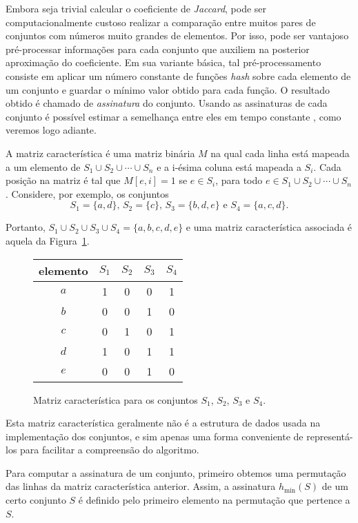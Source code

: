 Embora seja trivial calcular o coeficiente de \emph{Jaccard}, pode ser computacionalmente custoso realizar a comparação entre muitos pares de conjuntos com números muito grandes de elementos. Por isso, pode ser vantajoso pré-processar informações para cada conjunto que auxiliem na posterior aproximação do coeficiente. Em sua variante básica, tal pré-processamento consiste em aplicar um número constante de funções \emph{hash} sobre cada elemento de um conjunto e guardar o mínimo valor obtido para cada função. O resultado obtido é chamado de \emph{assinatura} do conjunto. Usando as assinaturas de cada conjunto é possível estimar a semelhança entre eles em tempo constante \cite{broder1997resemblance}, como veremos logo adiante.

A matriz característica é uma matriz binária $M$ na qual cada linha está mapeada a um elemento de $S_1 \cup S_2 \cup \cdots \cup S_n$ e a i-ésima coluna está mapeada a $S_i$. Cada posição na matriz é tal que $M[e, i] = 1$ se $e \in S_i$, para todo $e \in S_1 \cup S_2 \cup \cdots \cup S_n$. Considere, por exemplo, os conjuntos
\[
    S_1 = \{a, d\} \text{, } 
    S_2 = \{c\} \text{, } 
    S_3 = \{b, d, e\} \text{ e }
    S_4 = \{a, c, d\} \text{.}
\]

Portanto, $S_1 \cup S_2 \cup S_3 \cup S_4 = \{a, b, c, d, e\}$ e uma matriz característica associada é aquela da Figura~\ref{fig:minhash_charmatrix}.

\begin{figure}[!htbp]
\centering
\begin{tabular}{ c || c | c | c | c }
 elemento & $S_1$ & $S_2$ & $S_3$ & $S_4$ \\
\hline
  $a$ & 1   & 0   & 0   & 1   \\
  $b$ & 0   & 0   & 1   & 0   \\
  $c$ & 0   & 1   & 0   & 1   \\
  $d$ & 1   & 0   & 1   & 1   \\
  $e$ & 0   & 0   & 1   & 0   \\
\end{tabular}
\caption{Matriz característica para os conjuntos $S_1$, $S_2$, $S_3$ e $S_4$.}
\label{fig:minhash_charmatrix}
\end{figure}

Esta matriz característica geralmente não é a estrutura de dados usada na implementação dos conjuntos, e sim apenas uma forma conveniente de representá-los para facilitar a compreensão do algoritmo.

Para computar a assinatura de um conjunto, primeiro obtemos uma permutação das linhas da matriz característica anterior. Assim, a assinatura $h_{\min}(S)$ de um certo conjunto $S$ é definido pelo primeiro elemento na permutação que pertence a $S$.

